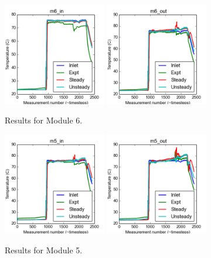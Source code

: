 \documentclass{article}
\begin{document}
\begin{figure}[!ht]
\centering
\includegraphics[width=0.4\textwidth]{../../data/ICSolar/images/Mar09_m6_in_compare.png}\hspace{0.05\textwidth}
\includegraphics[width=0.4\textwidth]{../../data/ICSolar/images/Mar09_m6_out_compare.png}\hspace{0.05\textwidth}\\
\caption{Results for Module 6.}\end{figure}
\begin{figure}[!ht]
\centering
\includegraphics[width=0.4\textwidth]{../../data/ICSolar/images/Mar09_m5_in_compare.png}\hspace{0.05\textwidth}
\includegraphics[width=0.4\textwidth]{../../data/ICSolar/images/Mar09_m5_out_compare.png}\hspace{0.05\textwidth}\\
\caption{Results for Module 5.}\end{figure}
\end{document}
